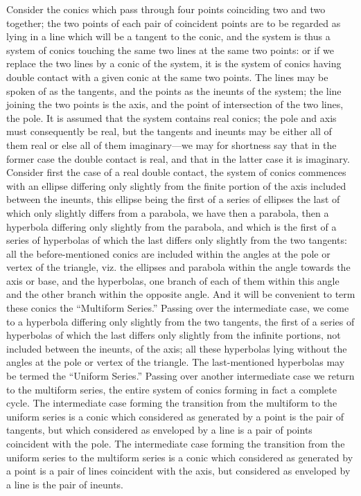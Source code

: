 \documentclass[11pt,a4paper]{article}
\theoremstyle{plain}
\begin{document}
Consider the conics which pass through four points coinciding two and two together; the two points of each pair of coincident points are to be regarded as lying in a line which will be a tangent to the conic, and the system is thus a system of conics touching the same two lines at the same two points: or if we replace the two lines by a conic of the system, it is the system of conics having double contact with a given conic at the same two points. The lines may be spoken of as the tangents, and the points as the ineunts of the system; the line joining the two points is the axis, and the point of intersection of the two lines, the pole. It is assumed that the system contains real conics; the pole and axis must consequently be real, but the tangents and ineunts may be either all of them real or else all of them imaginary---we may for shortness say that in the former case the double contact is real, and that in the latter case it is imaginary. Consider first the case of a real double contact, the system of conics commences with an ellipse differing only slightly from the finite portion of the axis included between the ineunts, this ellipse being the first of a series of ellipses the last of which only slightly differs from a parabola, we have then a parabola, then a hyperbola differing only slightly from the parabola, and which is the first of a series of hyperbolas of which the last differs only slightly from the two tangents: all the before-mentioned conics are included within the angles at the pole or vertex of the triangle, viz. the ellipses and parabola within the angle towards the axis or base, and the hyperbolas, one branch of each of them within this angle and the other branch within the opposite angle. And it will be convenient to term these conics the ``Multiform Series.'' Passing over the intermediate case, we come to a hyperbola differing only slightly from the two tangents, the first of a series of hyperbolas of which the last differs only slightly from the infinite portions, not included between the ineunts, of the axis; all these hyperbolas lying without the angles at the pole or vertex of the triangle. The last-mentioned hyperbolas may be termed the ``Uniform Series.'' Passing over another intermediate case we return to the multiform series, the entire system of conics forming in fact a complete cycle. The intermediate case forming the transition from the multiform to the uniform series is a conic which considered as generated by a point is the pair of tangents, but which considered as enveloped by a line is a pair of points coincident with the pole. The intermediate case forming the transition from the uniform series to the multiform series is a conic which considered as generated by a point is a pair of lines coincident with the axis, but considered as enveloped by a line is the pair of ineunts.
\end{document}
